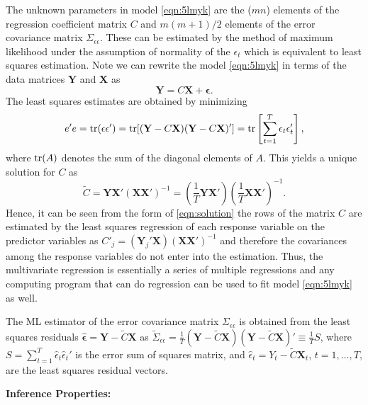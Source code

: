 The unknown parameters in model \eqref{eqn:5lmyk} are the ($mn$) elements of the regression coefficient matrix $C$ and $m(m+1)/2$ elements of the error covariance matrix $\Sigma_{\epsilon \epsilon}$. These can be estimated by the method of maximum likelihood under the assumption of normality of the $\epsilon_t$ which is equivalent to least squares estimation. Note we can rewrite the model \eqref{eqn:5lmyk} in terms of the data matrices $\mathbf{Y}$ and $\mathbf{X}$ as
	\begin{equation} \label{eqn:rewrite}
	\mathbf{Y} = C \mathbf{X} + \mathbf{\epsilon}.
	\end{equation}
The least squares estimates are obtained by minimizing
	\begin{equation} \label{eqn:minimize}
	e'e= \tr (\epsilon\epsilon')= \tr [(\mathbf{Y} - C\mathbf{X}) (\mathbf{Y} - C \mathbf{X})']= \tr \left[\sum_{t=1}^T \epsilon_t \epsilon_t' \right],
	\end{equation}
where $\operatorname{tr}(A)$ denotes the sum of the diagonal elements of $A$. This yields a unique solution for $C$ as
	\begin{equation} \label{eqn:solution}
	\tilde{C}= \mathbf{Y} \mathbf{X}' (\mathbf{X} \mathbf{X}')^{-1} = \left( \dfrac{1}{T} \mathbf{Y}\mathbf{X}' \right) \left( \dfrac{1}{T} \mathbf{X} \mathbf{X}' \right)^{-1}.
	\end{equation}
Hence, it can be seen from the form of \eqref{eqn:solution} the rows of the matrix $C$ are estimated by the least squares regression of each response variable on the predictor variables as $C'_j= (\mathbf{Y}_j' \mathbf{X})(\mathbf{X}\mathbf{X}')^{-1}$ and therefore the covariances among the response variables do not enter into the estimation. Thus, the multivariate regression is essentially a series of multiple regressions and any computing program that can do regression can be used to fit model \eqref{eqn:5lmyk} as well. 


The ML estimator of the error covariance matrix $\Sigma_{\epsilon\epsilon}$ is obtained from the least squares residuals $\hat{\mathbf{\epsilon}}= \mathbf{Y} - \tilde{C} \mathbf{X}$ as $\tilde{\Sigma}_{\epsilon\epsilon}= \frac{1}{T}(\mathbf{Y} - \tilde{C}\mathbf{X})(\mathbf{Y} - \tilde{C} \mathbf{X})' \equiv \frac{1}{T}S$, where $S= \sum_{t=1}^T \hat{\epsilon}_t \hat{\epsilon}_t'$ is the error sum of squares matrix, and $\hat{\epsilon}_t= Y_t - \tilde{C} \mathbf{X}_t$, $t=1,\ldots,T$, are the least squares residual vectors. \twomedskip


\noindent\textbf{Inference Properties:} \twomedskip



